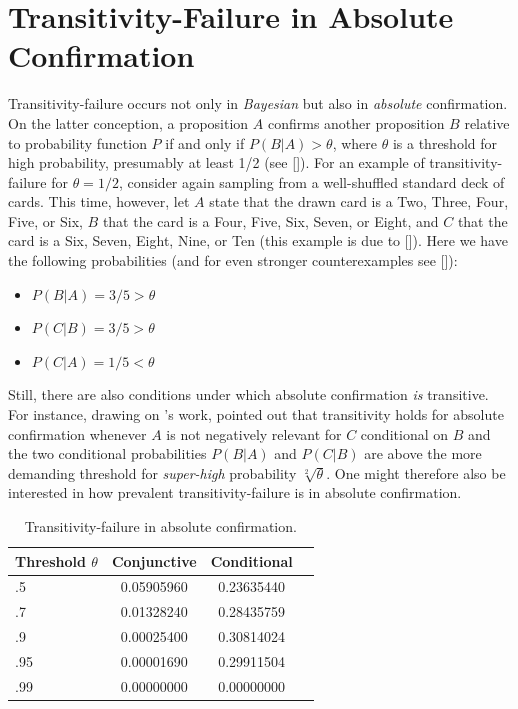 \documentclass[a4paper,11pt]{article}
\begin{document}
\section{Transitivity-Failure in Absolute Confirmation}
\label{sec4}

Transitivity-failure occurs not only in \emph{Bayesian} but also in \emph{absolute} confirmation. On the latter conception, a proposition $A$ confirms another proposition $B$ relative to probability function $P$ if and only if $P(B|A)>\theta$, where $\theta$ is a threshold for high probability, presumably at least 1/2 (see \citeauthor{Carnap1950} [\citeyear{Carnap1950}]). For an example of transitivity-failure for $\theta=1/2$, consider again sampling from a well-shuffled standard deck of cards. This time, however, let $A$ state that the drawn card is a Two, Three, Four, Five, or Six, $B$ that the card is a Four, Five, Six, Seven, or Eight, and $C$ that the card is a Six, Seven, Eight, Nine, or Ten (this example is due to \citeauthor{Roche2017} [\citeyear{Roche2017}]). Here we have the following probabilities (and for even stronger counterexamples see \citeauthor{Douven2011} [\citeyear{Douven2011}]):

\begin{itemize}
\item $P(B|A)=3/5>\theta$
\item $P(C|B)=3/5>\theta$
\item $P(C|A)=1/5<\theta$
\end{itemize}

\noindent Still, there are also conditions under which absolute confirmation \emph{is} transitive. For instance, drawing on \citeauthor{Hesse1970}'s \citeyearpar{Hesse1970} work, \cite{Roche2017} pointed out that transitivity holds for absolute confirmation whenever $A$ is not negatively relevant for $C$ conditional on $B$ and the two conditional probabilities $P(B|A)$ and $P(C|B)$ are above the more demanding threshold for \emph{super-high} probability $\sqrt[2]{\theta}$. One might therefore also be interested in how prevalent transitivity-failure is in absolute confirmation. 

\begin{table}[t]
\caption{Transitivity-failure in absolute confirmation.}
\centering
\begin{tabular}{lccc}
\hline
Threshold $\theta $ & Conjunctive & Conditional\\
\hline
.5 &  0.05905960  & 0.23635440 \\
.7 &  0.01328240  & 0.28435759 \\
.9 &  0.00025400 & 0.30814024 \\
.95&   0.00001690 &  0.29911504 \\
.99&   0.00000000 &  0.00000000\\
\hline
\end{tabular}
\label{tab}
\end{table}
\end{document}
